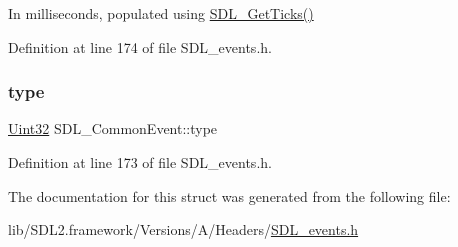 In milliseconds, populated using \mbox{\hyperlink{_s_d_l__timer_8h_a0b9bc71d6287e0ffafdc3419760fe2b3}{S\+D\+L\+\_\+\+Get\+Ticks()}} 

Definition at line 174 of file S\+D\+L\+\_\+events.\+h.

\mbox{\label{struct_s_d_l___common_event_a4ecd888325355321b42b2e2956f27453}} 
\subsubsection{\texorpdfstring{type}{type}}
{\footnotesize\ttfamily \mbox{\hyperlink{_s_d_l__stdinc_8h_add440eff171ea5f55cb00c4a9ab8672d}{Uint32}} S\+D\+L\+\_\+\+Common\+Event\+::type}



Definition at line 173 of file S\+D\+L\+\_\+events.\+h.



The documentation for this struct was generated from the following file\+:\begin{DoxyCompactItemize}
\item 
lib/\+S\+D\+L2.\+framework/\+Versions/\+A/\+Headers/\mbox{\hyperlink{_s_d_l__events_8h}{S\+D\+L\+\_\+events.\+h}}\end{DoxyCompactItemize}
